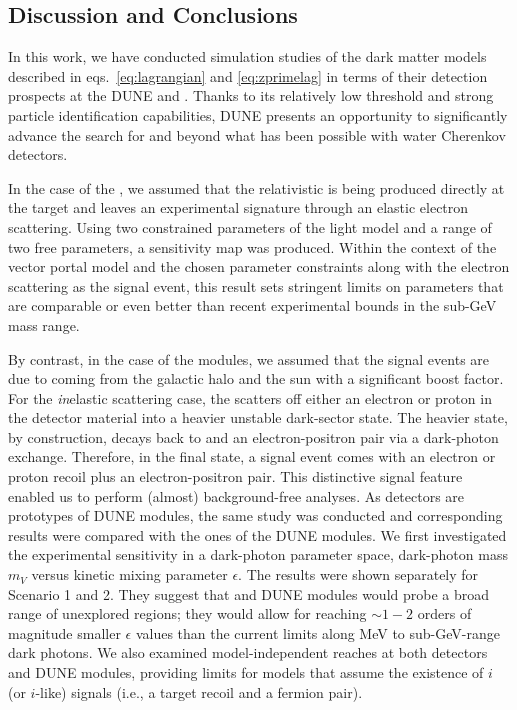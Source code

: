 \subsection{Discussion and Conclusions}

In this work, we have conducted simulation studies of the dark matter models described in eqs.~\eqref{eq:lagrangian} and \eqref{eq:zprimelag} in terms of their detection prospects at the DUNE  and . 
Thanks to its relatively low threshold and strong particle identification capabilities, DUNE presents an opportunity to significantly advance the search for  and  beyond what has been possible with water Cherenkov detectors.

In the case of the , we assumed that the relativistic  is being produced directly at the target and leaves an experimental signature through an elastic electron scattering. Using two constrained parameters of the light  model and a range of two free parameters, a sensitivity map was produced. Within the context of the vector portal  model and the chosen parameter constraints along with the electron scattering as the signal event, this result sets stringent limits on  parameters that are comparable or even better than recent experimental bounds in the sub-GeV mass range.

By contrast, in the case of the  modules, we assumed that the signal events are due to  coming from the galactic halo and the sun with a significant boost factor. 
For the \textit{in}elastic scattering case, the  scatters off either an electron or proton in the detector material into a heavier unstable dark-sector state.
The heavier state, by construction, decays back to  and an electron-positron pair via a dark-photon exchange. 
Therefore, in the final state, a signal event comes with an electron or proton recoil plus an electron-positron pair. 
This distinctive signal feature enabled us to perform (almost) background-free analyses. 
As  detectors are prototypes of DUNE  modules, the same study was conducted and corresponding results were compared with the ones of the DUNE  modules.  
We first investigated the experimental sensitivity in a dark-photon parameter space, dark-photon mass $m_V$ versus kinetic mixing parameter $\epsilon$. 
The results were shown separately for Scenario 1 and 2. 
They suggest that  and DUNE  modules would probe a broad range of unexplored regions; they would allow for reaching $\sim 1-2$ orders of magnitude smaller $\epsilon$ values than the current limits along MeV to sub-GeV-range dark photons. 
We also examined model-independent reaches at both  detectors and DUNE  modules, providing limits for models that assume the existence of $i$ (or $i$-like) signals (i.e., a target recoil and a fermion pair). 

